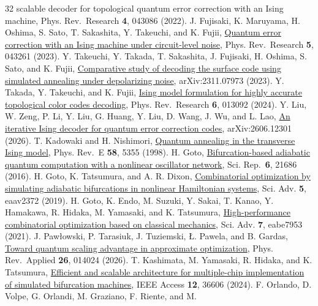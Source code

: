\documentclass[aps,prapplied,reprint,superscriptaddress,amsmath,amssymb,floatfix,nofootinbib]{revtex4-2}
\begin{document}
\begin{thebibliography}{32}
{  scalable decoder for topological quantum error correction with an
  Ising machine}, Phys. Rev.~Research \textbf{4}, 043086 (2022).
 J. Fujisaki, K. Maruyama, H. Oshima, S. Sato, T. Sakashita, Y.
  Takeuchi, and K. Fujii,
  \href{https://doi.org/10.1103/PhysRevResearch.5.043261}{Quantum error
  correction with an Ising machine under circuit-level noise}, Phys.
  Rev.~Research \textbf{5}, 043261 (2023).
 Y. Takeuchi, Y. Takada, T. Sakashita, J. Fujisaki, H. Oshima, S. Sato,
  and K. Fujii, \href{https://arxiv.org/abs/2311.07973}{Comparative
  study of decoding the surface code using simulated annealing under
  depolarizing noise}, arXiv:2311.07973 (2023).
 Y. Takada, Y. Takeuchi, and K. Fujii,
  \href{https://doi.org/10.1103/PhysRevResearch.6.013092}{Ising model
  formulation for highly accurate topological color codes decoding},
  Phys. Rev.~Research \textbf{6}, 013092 (2024).
 Y. Liu, W. Zeng, P. Li, Y. Liu, G. Huang, Y. Liu, D. Wang, J. Wu, and
  L. Lao, \href{https://arxiv.org/abs/2606.12301}{An iterative Ising
  decoder for quantum error correction codes}, arXiv:2606.12301 (2026).
 T. Kadowaki and H. Nishimori,
  \href{https://doi.org/10.1103/PhysRevE.58.5355}{Quantum annealing in
  the transverse Ising model}, Phys. Rev.~E \textbf{58}, 5355 (1998).
 H. Goto, \href{https://doi.org/10.1038/srep21686}{Bifurcation-based
  adiabatic quantum computation with a nonlinear oscillator network},
  Sci. Rep.~\textbf{6}, 21686 (2016).
 H. Goto, K. Tatsumura, and A. R. Dixon,
  \href{https://doi.org/10.1126/sciadv.aav2372}{Combinatorial
  optimization by simulating adiabatic bifurcations in nonlinear
  Hamiltonian systems}, Sci. Adv. \textbf{5}, eaav2372 (2019).
 H. Goto, K. Endo, M. Suzuki, Y. Sakai, T. Kanao, Y. Hamakawa, R.
  Hidaka, M. Yamasaki, and K. Tatsumura,
  \href{https://doi.org/10.1126/sciadv.abe7953}{High-performance
  combinatorial optimization based on classical mechanics}, Sci. Adv.
  \textbf{7}, eabe7953 (2021).
 J. Pawłowski, P. Tarasiuk, J. Tuziemski, Ł. Pawela, and B. Gardas,
  \href{https://doi.org/10.1103/qcws-8kgm}{Toward quantum scaling
  advantage in approximate optimization}, Phys. Rev.~Applied
  \textbf{26}, 014024 (2026).
 T. Kashimata, M. Yamasaki, R. Hidaka, and K. Tatsumura,
  \href{https://doi.org/10.1109/ACCESS.2024.3374089}{Efficient and
  scalable architecture for multiple-chip implementation of simulated
  bifurcation machines}, IEEE Access \textbf{12}, 36606 (2024).
 F. Orlando, D. Volpe, G. Orlandi, M. Graziano, F. Riente, and M.

\end{thebibliography}
\end{document}
